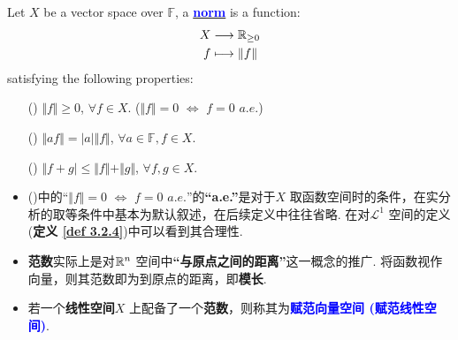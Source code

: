  	\begin{defn}\label{def 3.2.1}
 		Let $X$ be a vector space over $\mathbb{F}$, a \underline{\textcolor{blue}{\textbf{norm}}} is a function:
 		\begin{align}
 			X &\longrightarrow \mathbb{R}_{\geq 0} \\
 			f &\longmapsto \Vert f \Vert
 		\end{align}
 		satisfying the following properties:
 		\begin{enumerate}
 			\item[(\rmnum{1})]$\Vert f \Vert \geq 0$, $\forall f \in X$. \hspace*{3em} ($\Vert f \Vert = 0 \,\, \Leftrightarrow \,\, f = 0 \,\, a.e.$)
 			
 			\item[(\rmnum{2})]$\Vert af \Vert = \left| a \right| \Vert f \Vert$, $\forall a \in \mathbb{F}, f \in X$.
 			
 			\item[(\rmnum{3})]$\Vert f + g \vert \leq \Vert f \Vert + \Vert g \Vert$, $\forall f , g \in X$.
 		\end{enumerate}
 		
 		\vspace{2em}
 		\begin{rmk}
 			\begin{itemize}
 				\item ()中的“$\Vert f \Vert = 0 \,\, \Leftrightarrow \,\, f = 0 \,\, a.e.$”的\textbf{“a.e.”}是对于$X$ 取函数空间时的条件，在实分析的取等条件中基本为默认叙述，在后续定义中往往省略. 在对$\mathcal{L}^1$ 空间的定义 (\textbf{定义 \ref{def 3.2.4}})中可以看到其合理性.
 				
 				\vspace{1em}
 				
 				\item \textbf{范数}实际上是对$\mathbb{R}^n$ 空间中\textbf{“与原点之间的距离”}这一概念的推广. 将函数视作向量，则其范数即为到原点的距离，即\textbf{模长}.
 				
 				\vspace{1em}
 				
 				\item 若一个\textbf{线性空间}$X$ 上配备了一个\textbf{范数}，则称其为\textcolor{blue}{\textbf{赋范向量空间 (赋范线性空间)}}.
 			\end{itemize}
 		\end{rmk}
 	\end{defn}
 

